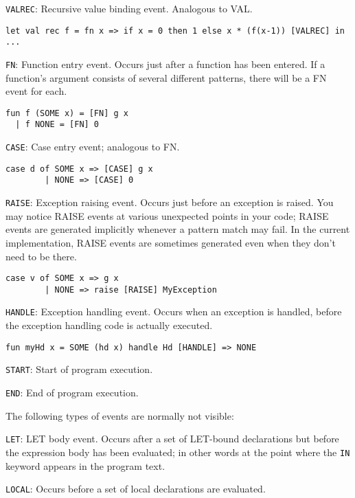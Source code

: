 \verb'VALREC': Recursive value binding event.  Analogous to VAL.

\begin{verbatim}
let val rec f = fn x => if x = 0 then 1 else x * (f(x-1)) [VALREC] in ...
\end{verbatim}

\verb'FN': Function entry event.  Occurs just after a function has been
entered.  If a function's argument consists of several different
patterns, there will be a FN event for each.

\begin{verbatim}
fun f (SOME x) = [FN] g x
  | f NONE = [FN] 0
\end{verbatim}

\verb'CASE': Case entry event; analogous to FN.

\begin{verbatim}
case d of SOME x => [CASE] g x
        | NONE => [CASE] 0
\end{verbatim}


\verb'RAISE': Exception raising event.  Occurs just before an exception is
raised.  You may notice RAISE events at various unexpected points in
your code; RAISE events are generated implicitly whenever a pattern
match may fail.  In the current implementation, RAISE events are
sometimes generated even when they don't need to be there.

\begin{verbatim}
case v of SOME x => g x
        | NONE => raise [RAISE] MyException
\end{verbatim}

\verb'HANDLE': Exception handling event.  Occurs when an exception is
handled, before the exception handling code is actually executed.

\begin{verbatim}
fun myHd x = SOME (hd x) handle Hd [HANDLE] => NONE
\end{verbatim}

\verb'START': Start of program execution.

\verb'END': End of program execution.

The following types of events are normally not visible:

\verb'LET': LET body event.  Occurs after a set of LET-bound declarations
but before the expression body has been evaluated; in other words at the 
point where the \verb'IN' keyword appears in the program text.

\verb'LOCAL': Occurs before a set of local declarations are evaluated.

